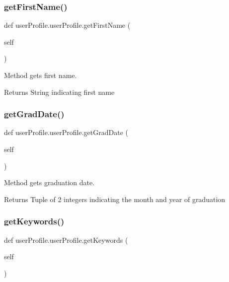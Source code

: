 \subsubsection{\texorpdfstring{get\+First\+Name()}{getFirstName()}}
{\footnotesize\ttfamily def user\+Profile.\+user\+Profile.\+get\+First\+Name (\begin{DoxyParamCaption}\item[{}]{self }\end{DoxyParamCaption})}



Method gets first name. 

\begin{DoxyReturn}{Returns}
String indicating first name 
\end{DoxyReturn}
\mbox{\label{classuserProfile_1_1userProfile_acdaf40b01b5086ab70b8802ba944b337}} 
\subsubsection{\texorpdfstring{get\+Grad\+Date()}{getGradDate()}}
{\footnotesize\ttfamily def user\+Profile.\+user\+Profile.\+get\+Grad\+Date (\begin{DoxyParamCaption}\item[{}]{self }\end{DoxyParamCaption})}



Method gets graduation date. 

\begin{DoxyReturn}{Returns}
Tuple of 2 integers indicating the month and year of graduation 
\end{DoxyReturn}
\mbox{\label{classuserProfile_1_1userProfile_a1a61a204207c67cc6bc2c0b2b810ea32}} 
\subsubsection{\texorpdfstring{get\+Keywords()}{getKeywords()}}
{\footnotesize\ttfamily def user\+Profile.\+user\+Profile.\+get\+Keywords (\begin{DoxyParamCaption}\item[{}]{self }\end{DoxyParamCaption})}



